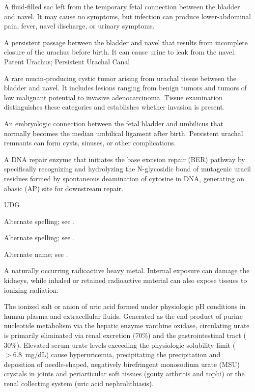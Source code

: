  A fluid-filled sac left from the temporary fetal connection between the bladder and navel. It may cause no symptoms, but infection can produce lower-abdominal pain, fever, navel discharge, or urinary symptoms.

 A persistent passage between the bladder and navel that results from incomplete closure of the urachus before birth. It can cause urine to leak from the navel.
\synonyms
Patent Urachus; Persistent Urachal Canal

 A rare mucin-producing cystic tumor arising from
urachal tissue between the bladder and navel. It includes lesions ranging from benign tumors
and tumors of low malignant potential to invasive adenocarcinoma. Tissue examination
distinguishes these categories and establishes whether invasion is present.

 An embryologic connection between the fetal bladder and umbilicus that normally becomes the median umbilical ligament after birth. Persistent urachal remnants can form cysts, sinuses, or other complications.

 A DNA repair enzyme that initiates the base excision repair (BER) pathway by specifically recognizing and hydrolyzing the N-glycosidic bond of mutagenic uracil residues formed by spontaneous deamination of cytosine in DNA, generating an abasic (AP) site for downstream repair.

\synonyms
UDG

 Alternate spelling; see .

 Alternate spelling; see .

 Alternate name; see .

 A naturally occurring radioactive heavy metal. Internal exposure can damage the kidneys, while inhaled or retained radioactive material can also expose tissues to ionizing radiation.

 The ionized salt or anion of uric acid formed under physiologic pH conditions in human plasma and extracellular fluids. Generated as the end product of purine nucleotide metabolism via the hepatic enzyme xanthine oxidase, circulating urate is primarily eliminated via renal excretion ($70\%$) and the gastrointestinal tract ($30\%$). Elevated serum urate levels exceeding the physiologic solubility limit ($>6.8$~mg/dL) cause hyperuricemia, precipitating the precipitation and deposition of needle-shaped, negatively birefringent monosodium urate (MSU) crystals in joints and periarticular soft tissues (gouty arthritis and tophi) or the renal collecting system (uric acid nephrolithiasis).

